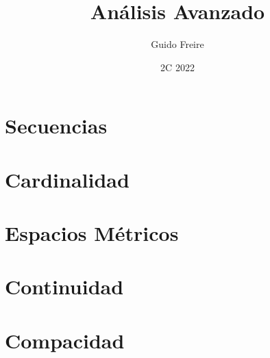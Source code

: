 \documentclass{article}
\title{An\'alisis Avanzado}
\author{Guido Freire}
\date{2C 2022}
\begin{document}
\maketitle

\section{Secuencias}

\section{Cardinalidad}

\section{Espacios M\'etricos}

\section{Continuidad}

\section{Compacidad}
\end{document}
